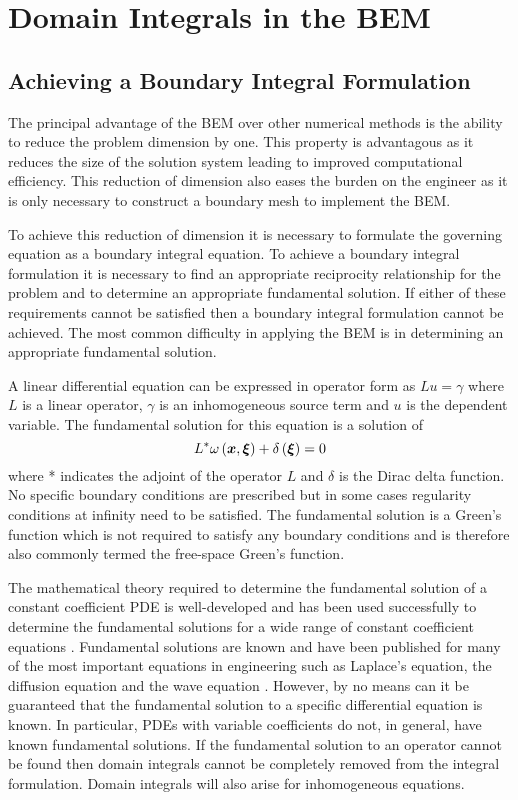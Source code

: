 \chapter{Domain Integrals in the BEM}

\section{Achieving a Boundary Integral Formulation}

The principal advantage of the BEM over other numerical methods is the
ability to reduce the problem dimension by one.  This property is
advantagous as it reduces the size of the solution system leading to
improved computational efficiency.  This reduction of dimension also eases
the burden on the engineer as it is only necessary to construct a boundary
mesh to implement the BEM.

To achieve this reduction of dimension it is necessary to formulate the
governing equation as a boundary integral equation.  To achieve a boundary
integral formulation it is necessary to find an appropriate reciprocity
relationship for the problem and to determine an appropriate fundamental
solution.  If either of these requirements cannot
be satisfied then a boundary integral formulation cannot be achieved.  The
most common difficulty in applying the BEM is in determining an appropriate
fundamental solution.

A linear differential equation can be expressed in operator form as $Lu =
\gamma$ where $L$ is a linear operator, $\gamma$ is an inhomogeneous source
term and $u$ is the dependent variable.  The fundamental solution for this
equation is a solution of
\begin{equation}
  L^{*} \fnof{\omega}{\vect{x},\vect{\xi}}  + \fnof{\delta}{\vect{\xi}} = 0
\end{equation}
where * indicates the adjoint of the operator $L$ and $\delta$ is the Dirac
delta function.  No specific boundary conditions are prescribed but in some
cases regularity conditions at infinity need to be satisfied. The
fundamental solution is a Green's function which is not required to satisfy
any boundary conditions and is therefore also commonly termed the
free-space Green's function.

The mathematical theory required to determine the fundamental solution of a
constant coefficient PDE is well-developed and has been used successfully
to determine the fundamental solutions for a wide range of constant
coefficient equations \cite{walker:1980} \cite{clements:1978}
\cite{ortner:1987}.  Fundamental solutions are known and have been
published for many of the most important equations in engineering such as
Laplace's equation, the diffusion equation and the wave equation
\cite{brebbia:1984b}.  However, by no means can it be guaranteed that the
fundamental solution to a specific differential equation is known.  In
particular, PDEs with variable coefficients do not, in general, have known
fundamental solutions.  If the fundamental solution to an operator cannot
be found then domain integrals cannot be completely removed from the
integral formulation.  Domain integrals will also arise for inhomogeneous
equations.

